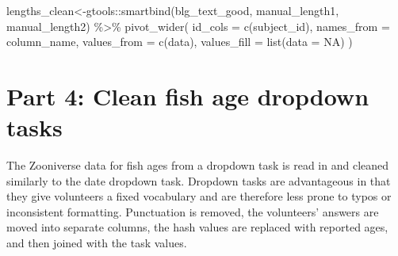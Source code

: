 \documentclass[
]{article}
\newenvironment{Shaded}{\begin{snugshade}}{\end{snugshade}}
\newcommand{\AttributeTok}[1]{\textcolor[rgb]{0.77,0.63,0.00}{#1}}
\newcommand{\ConstantTok}[1]{\textcolor[rgb]{0.00,0.00,0.00}{#1}}
\newcommand{\FunctionTok}[1]{\textcolor[rgb]{0.00,0.00,0.00}{#1}}
\newcommand{\NormalTok}[1]{#1}
\newcommand{\OtherTok}[1]{\textcolor[rgb]{0.56,0.35,0.01}{#1}}
\newcommand{\SpecialCharTok}[1]{\textcolor[rgb]{0.00,0.00,0.00}{#1}}
\begin{document}
\begin{Shaded}
\begin{Highlighting}[]
\NormalTok{lengths\_clean}\OtherTok{\textless{}{-}}\NormalTok{gtools}\SpecialCharTok{::}\FunctionTok{smartbind}\NormalTok{(blg\_text\_good, manual\_length1, manual\_length2) }\SpecialCharTok{\%\textgreater{}\%}
             \FunctionTok{pivot\_wider}\NormalTok{( }
                               \AttributeTok{id\_cols =} \FunctionTok{c}\NormalTok{(subject\_id),}
                               \AttributeTok{names\_from =}\NormalTok{ column\_name, }
                               \AttributeTok{values\_from =} \FunctionTok{c}\NormalTok{(data), }
                               \AttributeTok{values\_fill =} \FunctionTok{list}\NormalTok{(}\AttributeTok{data =} \ConstantTok{NA}\NormalTok{) )}
\end{Highlighting}
\end{Shaded}

\hypertarget{part-4-clean-fish-age-dropdown-tasks}{%
\section{Part 4: Clean fish age dropdown
tasks}\label{part-4-clean-fish-age-dropdown-tasks}}

The Zooniverse data for fish ages from a dropdown task is read in and
cleaned similarly to the date dropdown task. Dropdown tasks are
advantageous in that they give volunteers a fixed vocabulary and are
therefore less prone to typos or inconsistent formatting. Punctuation is
removed, the volunteers' answers are moved into separate columns, the
hash values are replaced with reported ages, and then joined with the
task values.
\end{document}
